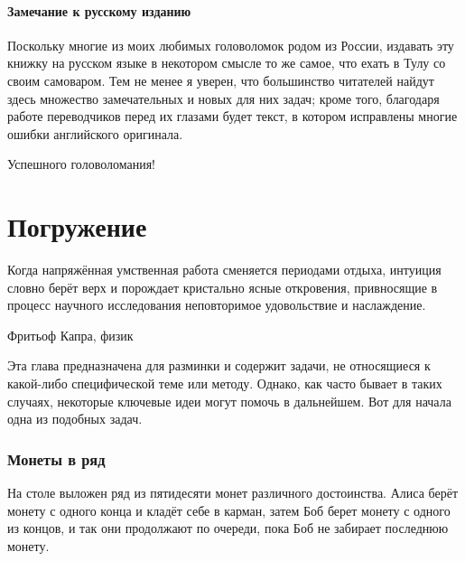 \documentclass[twoside]{book}
\makeatletter
\newcommand{\rindex}[2][\imki@jobname]{%
\index[#1]{\detokenize{#2}}%
}
\makeatother
\begin{document}

\subsubsection*{Замечание к русскому изданию}

Поскольку многие из моих любимых головоломок родом из России, издавать эту книжку на русском языке в некотором смысле то же самое, что ехать в Тулу со своим самоваром.
Тем не менее я уверен, что большинство читателей найдут здесь множество замечательных и новых для них задач; кроме того, благодаря работе переводчиков перед их глазами будет текст, в котором исправлены многие ошибки английского ори\-ги\-нала.

Успешного головоломания!




\chapter{Погружение} 

\thispagestyle{empty}

\setlength{\epigraphwidth}{.6\textwidth}
\epigraph{Когда напряжённая умственная работа сменяется периодами отдыха, интуиция словно берёт верх и порождает кристально ясные откровения, привносящие в процесс научного исследования неповторимое удовольствие и наслаждение.\vspace{1ex}}{Фритьоф Капра, физик}

Эта глава предназначена для разминки и содержит задачи, не относящиеся к какой-либо специфической теме или методу.
Однако, как часто бывает в таких случаях, некоторые ключевые идеи могут помочь в дальнейшем.
Вот для начала одна из подобных задач.

\subsection*{Монеты в ряд} %
\rindex{Монеты в ряд}

На столе выложен ряд из пятидесяти монет различного достоинства.
Алиса берёт монету с одного конца и кладёт себе в карман, затем Боб берет монету с одного из концов, и так они продолжают по очереди, пока Боб не забирает последнюю монету.
\end{document}
